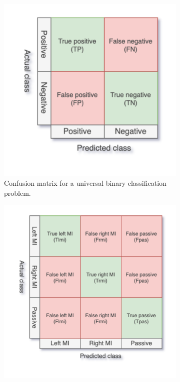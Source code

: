 \begin{figure}[t]
    \centering
    \begin{subfigure}{0.45\textwidth}
        \centering
        \includegraphics[width=\textwidth]{../images/pipeline/cm_binary.pdf}
        \captionsetup{width=\linewidth}
        \captionsetup{justification=centering}
        \caption{Confusion matrix for a universal binary classification problem.}
        \label{fig:processing_signals_cm_binary}
    \end{subfigure}
    \hfill
    \begin{subfigure}{0.45\textwidth}
        \centering
        \includegraphics[width=\textwidth]{../images/pipeline/cm_three_class.pdf}

\end{subfigure}
\end{figure}
